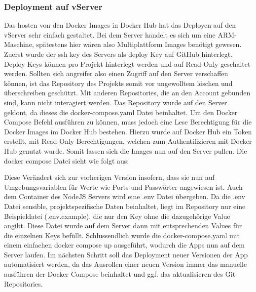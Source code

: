 \subsubsection{Deployment auf vServer}
Das hosten von den Docker Images in Docker Hub hat das Deployen auf den vServer sehr einfach gestaltet.
Bei dem Server handelt es sich um eine ARM-Maschine, spätestens hier wären also Multiplattform Images benötigt gewesen.
Zuerst wurde der ssh key des Servers als deploy Key auf GitHub hinterlegt.
Deploy Keys können pro Projekt hinterlegt werden und auf Read-Only geschaltet werden.
Sollten sich angreifer also einen Zugriff auf den Server verschaffen können, ist das Repository des Projekts somit vor ungewolltem löschen und überschreiben geschützt.
Mit anderen Repositories, die an den Account gebunden sind, kann nicht interagiert werden.
Das Repository wurde auf den Server geklont, da dieses die docker-compose.yaml Datei beinhaltet.
Um den Docker Compose Befehl ausführen zu können, muss jedoch eine Lese Berechtigung für die Docker Images im Docker Hub bestehen.
Hierzu wurde auf Docker Hub ein Token erstellt, mit Read-Only Berechtigungen, welchen zum Authentifizieren mit Docker Hub genutzt wurde.
Somit lassen sich die Images nun auf den Server pullen.
Die docker compose Datei sieht wie folgt aus:

% 

Diese Verändert sich zur vorherigen Version insofern, dass sie nun auf Umgebungsvariablen für Werte wie Ports und Passwörter angewiesen ist.
Auch dem Container des NodeJS Servers wird eine .env Datei übergeben.
Da die .env Datei sensible, projektspezifische Daten beinhaltet, liegt im Repository nur eine Beispieldatei (.env.example), die nur den Key ohne die dazugehörige Value angibt.
Diese Datei wurde auf dem Server dann mit entsprechenden Values für die einzelnen Keys befüllt.
Schlussendlich wurde die docker-compose.yaml mit einem einfachen docker compose up ausgeführt, wodurch die Apps nun auf dem Server laufen.
Im nächsten Schritt soll das Deployment neuer Versionen der App automatisiert werden, da das Ausrollen einer neuen Version immer das manuelle ausführen der Docker Compose beinhaltet und ggf. das aktualisieren des Git Repositories.
